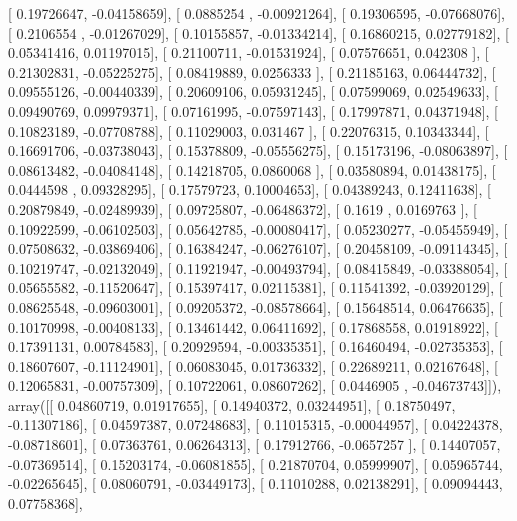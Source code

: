 \documentclass{article}
\begin{document}
       [ 0.19726647, -0.04158659],
       [ 0.0885254 , -0.00921264],
       [ 0.19306595, -0.07668076],
       [ 0.2106554 , -0.01267029],
       [ 0.10155857, -0.01334214],
       [ 0.16860215,  0.02779182],
       [ 0.05341416,  0.01197015],
       [ 0.21100711, -0.01531924],
       [ 0.07576651,  0.042308  ],
       [ 0.21302831, -0.05225275],
       [ 0.08419889,  0.0256333 ],
       [ 0.21185163,  0.06444732],
       [ 0.09555126, -0.00440339],
       [ 0.20609106,  0.05931245],
       [ 0.07599069,  0.02549633],
       [ 0.09490769,  0.09979371],
       [ 0.07161995, -0.07597143],
       [ 0.17997871,  0.04371948],
       [ 0.10823189, -0.07708788],
       [ 0.11029003,  0.031467  ],
       [ 0.22076315,  0.10343344],
       [ 0.16691706, -0.03738043],
       [ 0.15378809, -0.05556275],
       [ 0.15173196, -0.08063897],
       [ 0.08613482, -0.04084148],
       [ 0.14218705,  0.0860068 ],
       [ 0.03580894,  0.01438175],
       [ 0.0444598 ,  0.09328295],
       [ 0.17579723,  0.10004653],
       [ 0.04389243,  0.12411638],
       [ 0.20879849, -0.02489939],
       [ 0.09725807, -0.06486372],
       [ 0.1619    ,  0.0169763 ],
       [ 0.10922599, -0.06102503],
       [ 0.05642785, -0.00080417],
       [ 0.05230277, -0.05455949],
       [ 0.07508632, -0.03869406],
       [ 0.16384247, -0.06276107],
       [ 0.20458109, -0.09114345],
       [ 0.10219747, -0.02132049],
       [ 0.11921947, -0.00493794],
       [ 0.08415849, -0.03388054],
       [ 0.05655582, -0.11520647],
       [ 0.15397417,  0.02115381],
       [ 0.11541392, -0.03920129],
       [ 0.08625548, -0.09603001],
       [ 0.09205372, -0.08578664],
       [ 0.15648514,  0.06476635],
       [ 0.10170998, -0.00408133],
       [ 0.13461442,  0.06411692],
       [ 0.17868558,  0.01918922],
       [ 0.17391131,  0.00784583],
       [ 0.20929594, -0.00335351],
       [ 0.16460494, -0.02735353],
       [ 0.18607607, -0.11124901],
       [ 0.06083045,  0.01736332],
       [ 0.22689211,  0.02167648],
       [ 0.12065831, -0.00757309],
       [ 0.10722061,  0.08607262],
       [ 0.0446905 , -0.04673743]]), array([[ 0.04860719,  0.01917655],
       [ 0.14940372,  0.03244951],
       [ 0.18750497, -0.11307186],
       [ 0.04597387,  0.07248683],
       [ 0.11015315, -0.00044957],
       [ 0.04224378, -0.08718601],
       [ 0.07363761,  0.06264313],
       [ 0.17912766, -0.0657257 ],
       [ 0.14407057, -0.07369514],
       [ 0.15203174, -0.06081855],
       [ 0.21870704,  0.05999907],
       [ 0.05965744, -0.02265645],
       [ 0.08060791, -0.03449173],
       [ 0.11010288,  0.02138291],
       [ 0.09094443,  0.07758368],
\end{document}
